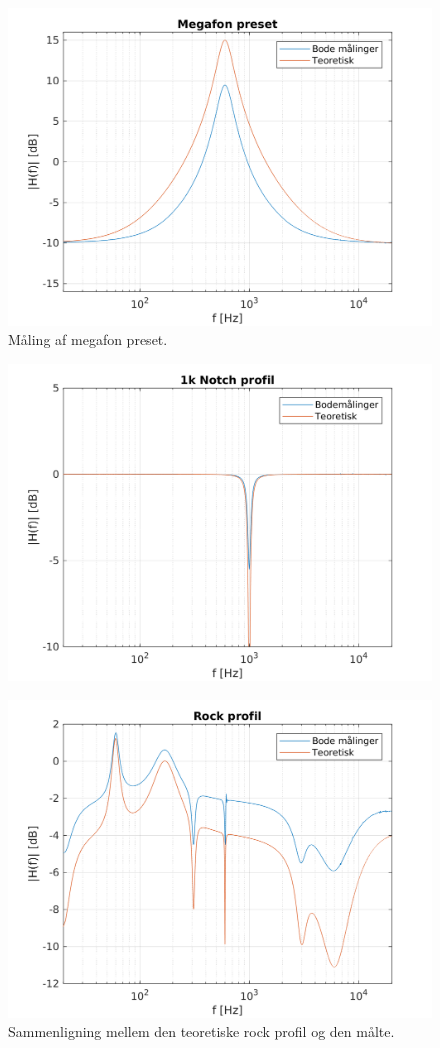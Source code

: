 \begin{figure}[h]
\centering
\includegraphics[]{matlabdemo/test/eq_megafon.png}
\caption{Måling af megafon preset.}
\end{figure}

\begin{figure}[h]
    \centering
    \includegraphics[]{matlabdemo/test/eq_1knotch.png}
\end{figure}

\begin{figure}[h]
\includegraphics[]{matlabdemo/test/eq_rock.png}
\caption{Sammenligning mellem den teoretiske rock profil og den målte.}
\end{figure}



